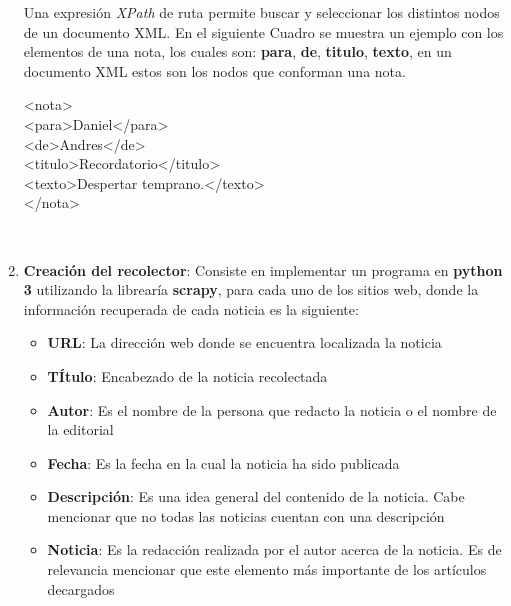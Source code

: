 \begin{enumerate}
  Una expresión \textit{XPath} de ruta permite buscar y seleccionar los distintos nodos de un documento XML. En el siguiente Cuadro se muestra un ejemplo con los elementos de una nota, los cuales son: \textbf{para}, \textbf{de}, \textbf{titulo}, \textbf{texto}, en un documento XML estos son los nodos que conforman una nota.\\


\begin{tcolorbox}[label=box:xmlEjemplo,adjusted title=flush center,halign title=flush center,titlerule=3mm,title= XML] 

\begin{tabbing}
<nota> \= \\\kill
\>  <para>Daniel</para>\\
\>  <de>Andres</de>\\
\>  <titulo>Recordatorio</titulo>\\
\>  <texto>Despertar temprano.</texto>\\
</nota>
\end{tabbing}

\end{tcolorbox}
\ \\



  \item \textbf{Creación del recolector}: Consiste en implementar un programa en \textbf{python 3} utilizando la librearía  \textbf{scrapy}, para cada uno de los sitios web, donde la información recuperada de cada noticia es la siguiente:

  \begin{itemize}
  \item \textbf{URL}: La dirección web donde se encuentra localizada la noticia 
  \item \textbf{TÍtulo}: Encabezado de la noticia recolectada
  \item \textbf{Autor}: Es el nombre de la persona que redacto la noticia o el nombre de la editorial
  \item \textbf{Fecha}: Es la fecha en la cual la noticia ha sido publicada
  \item \textbf{Descripción}: Es una idea general del contenido de la noticia. Cabe mencionar que no todas las noticias cuentan con una descripción
  \item \textbf{Noticia}: Es la redacción realizada por el autor acerca de la noticia. Es de relevancia mencionar que este elemento más importante de los artículos decargados\\ 
\end{itemize}




\end{enumerate}
